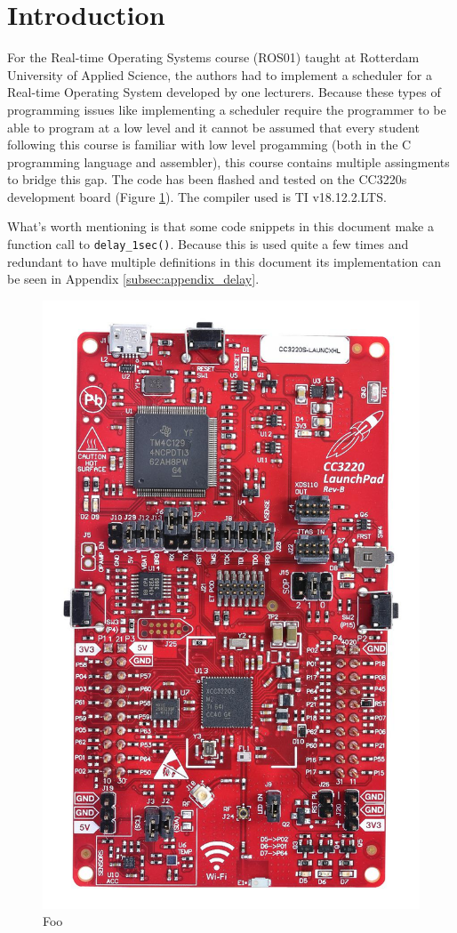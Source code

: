 \section{Introduction}

For the Real-time Operating Systems course (ROS01) taught at Rotterdam University of Applied Science,
the authors had to implement a scheduler for a Real-time Operating System developed by one lecturers.
Because these types of programming issues like implementing a scheduler require the programmer to be able to program at a low level and it cannot be assumed that every student following this course is familiar with low level progamming (both in the C programming language and assembler), this course contains multiple assingments to bridge this gap.
The code has been flashed and tested on the CC3220s development board (Figure \ref{fig:cc3220s}). The compiler used is TI v18.12.2.LTS.

What's worth mentioning is that some code snippets in this document make a function call to \texttt{delay\_1sec()}.
Because this is used quite a few times and redundant to have multiple definitions in this document its implementation can be seen in Appendix \ref{subsec:appendix_delay}.


\begin{figure}[H]
    \centering

    \includegraphics[angle=90,scale=0.2]{img/cc3220s.jpg}

    \caption{Foo}
    \label{fig:cc3220s}

\end{figure}
